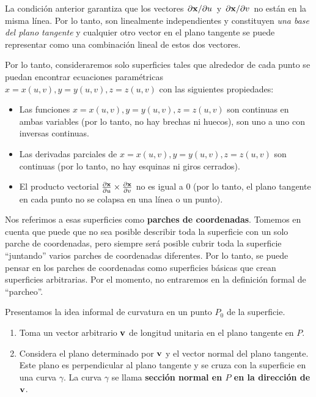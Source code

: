 La condición anterior garantiza que los vectores $\pdv*{\vb{x}}{u}$ y $\pdv*{\vb{x}}{v}$ no están en la misma línea. Por lo tanto, son linealmente independientes y constituyen \emph{una base del plano tangente} y cualquier otro vector en el plano tangente se puede representar como una combinación lineal de estos dos vectores.
\par
Por lo tanto, consideraremos solo superficies tales que alrededor de cada punto se puedan encontrar ecuaciones paramétricas $x = x (u, v), y = y (u, v), z = z (u, v)$ con las siguientes propiedades:
\begin{itemize}
\item Las funciones $x = x (u, v), y = y (u, v), z = z (u, v)$ son continuas en ambas variables (por lo tanto, no hay brechas ni huecos), son uno a uno con inversas continuas.
\item Las derivadas parciales de $x = x (u, v), y = y (u, v), z = z (u, v)$ son continuas (por lo tanto, no hay esquinas ni giros cerrados).
\item El producto vectorial  $\pdv{\vb{x}}{u} \times \pdv{\vb{x}}{v}$ no es igual a $0$ (por lo tanto, el plano tangente en cada punto no se colapsa en una línea o un punto).
\end{itemize}
Nos referimos a esas superficies como \textbf{parches de coordenadas}. Tomemos  en cuenta que puede que no sea posible describir toda la superficie con un solo parche de coordenadas, pero siempre será posible cubrir toda la superficie \enquote{juntando} varios parches de coordenadas diferentes. Por lo tanto, se puede pensar en los parches de coordenadas como superficies básicas que crean superficies arbitrarias. Por el momento, no entraremos en la definición formal de \enquote{parcheo}.
\par
Presentamos la idea informal de curvatura en un punto $P_{0}$ de la superficie. 
\begin{enumerate}
\item Toma un vector arbitrario $\vb{v}$ de longitud unitaria en el plano tangente en $P$.
\item Considera el plano determinado por $\vb{v}$ y el vector normal del plano tangente. Este plano es perpendicular al plano tangente y se cruza con la superficie en una curva $\gamma$. La curva $\gamma$ se llama \textbf{sección normal en $P$ en la dirección de $\vb{v}$}.
\end{enumerate}
